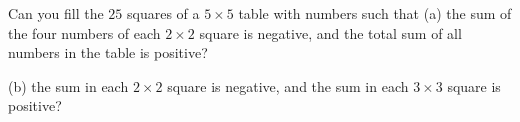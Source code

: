 Can you fill the $25$ squares of a $5 \times 5$ table with numbers such that (a) the sum of the four numbers of each $2 \times 2$ square is negative, and the total sum of all numbers in the table is positive?

(b) the sum in each $2 \times 2$ square is negative, and the sum in each $3 \times 3$ square is positive?
